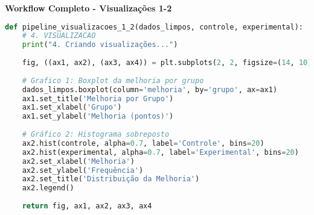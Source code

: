\begin{examplebox}
\textbf{Workflow Completo - Visualizações 1-2}

\begin{lstlisting}[language=Python]
def pipeline_visualizacoes_1_2(dados_limpos, controle, experimental):
    # 4. VISUALIZACAO
    print("4. Criando visualizações...")
    
    fig, ((ax1, ax2), (ax3, ax4)) = plt.subplots(2, 2, figsize=(14, 10))
    
    # Grafico 1: Boxplot da melhoria por grupo
    dados_limpos.boxplot(column='melhoria', by='grupo', ax=ax1)
    ax1.set_title('Melhoria por Grupo')
    ax1.set_xlabel('Grupo')
    ax1.set_ylabel('Melhoria (pontos)')
    
    # Gráfico 2: Histograma sobreposto
    ax2.hist(controle, alpha=0.7, label='Controle', bins=20)
    ax2.hist(experimental, alpha=0.7, label='Experimental', bins=20)
    ax2.set_xlabel('Melhoria')
    ax2.set_ylabel('Frequência')
    ax2.set_title('Distribuição da Melhoria')
    ax2.legend()
    
    return fig, ax1, ax2, ax3, ax4
\end{lstlisting}
\end{examplebox}

